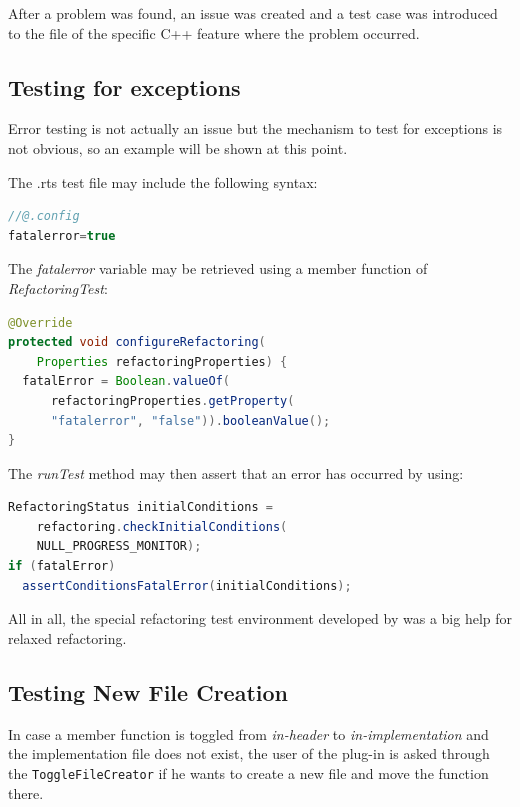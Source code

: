 After a problem was found, an issue was created and a test case was introduced
to the file of the specific C++ feature where the problem occurred. 

\subsection{Testing for exceptions}

Error testing is not actually an issue but the mechanism to test for exceptions 
is not obvious, so an example will be shown at this point. 

The .rts test file may include the following syntax:

\begin{lstlisting}[caption={Syntax to set variables inside a .rts file},
language=java]
//@.config
fatalerror=true
\end{lstlisting}

The \textit{fatalerror} variable may be retrieved using a member function of \textit{RefactoringTest}:
\begin{lstlisting}[caption={Accessing a property set in the .rts file},
language=java]
@Override
protected void configureRefactoring(
    Properties refactoringProperties) {
  fatalError = Boolean.valueOf(
      refactoringProperties.getProperty(
      "fatalerror", "false")).booleanValue();
}
\end{lstlisting}

The \textit{runTest} method may then assert that an error has occurred by using:
\begin{lstlisting}[caption={Checking for errors inside the refactoring test class},language=java]
RefactoringStatus initialConditions = 
    refactoring.checkInitialConditions(
    NULL_PROGRESS_MONITOR);
if (fatalError)
  assertConditionsFatalError(initialConditions);
\end{lstlisting}

All in all, the special refactoring test environment developed by \cite{GB06} 
was a big help for relaxed refactoring.

\subsection{Testing New File Creation}

In case a member function is toggled from \textit{in-header} to
\textit{in-implementation} and the implementation file does not exist, the user
of the plug-in is asked through the \texttt{ToggleFileCreator} if he wants to
create a new file and move the function there.

